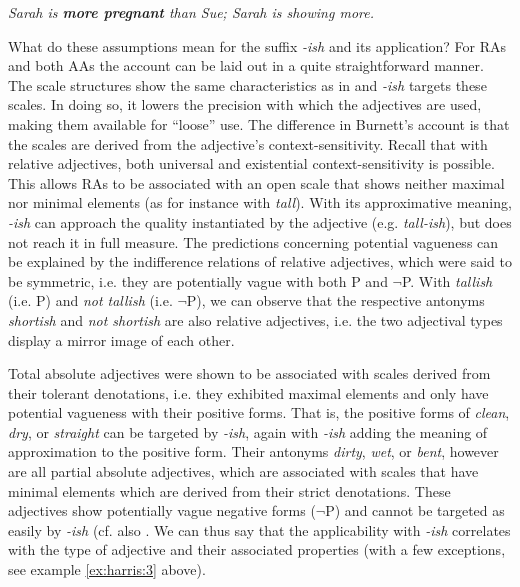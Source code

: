 \documentclass[output=paper]{langsci/langscibook}
\begin{document}
\ea
	\itshape Sarah is \textbf{more pregnant} than Sue; Sarah is showing more.
\z

What do these assumptions mean for the suffix \textit{-ish} and its application? For RAs and both AAs the account can be laid out in a quite straightforward manner. The scale structures show the same characteristics as in \citet*{Bochnak2014} and \textit{-ish} targets these scales. In doing so, it lowers the precision with which the adjectives are used, making them available for ``loose'' use. The difference in Burnett's \citeyearpar{Burnett2017} account is that the scales are derived from the adjective's context-sensitivity. Recall that with relative adjectives, both universal and existential context-sensitivity is possible. This allows RAs to be associated with an open scale that shows neither maximal nor minimal elements (as for instance with \textit{tall}). With its approximative meaning, \textit{-ish} can approach the quality instantiated by the adjective (e.g. \textit{tall-ish}), but does not reach it in full measure. The predictions concerning potential vagueness can be explained by the indifference relations of relative adjectives, which were said to be symmetric, i.e. they are potentially vague with both P and $\neg$P. With \textit{tallish} (i.e. P) and \textit{not tallish} (i.e. $\neg$P), we can observe that the respective antonyms \textit{shortish} and \textit{not shortish} are also relative adjectives, i.e. the two adjectival types display a mirror image of each other.

Total absolute adjectives were shown to be associated with scales derived from their tolerant denotations, i.e. they exhibited maximal elements and only have potential vagueness with their positive forms. That is, the positive forms of \textit{clean}, \textit{dry}, or \textit{straight} can be targeted by \textit{-ish}, again with \textit{-ish} adding the meaning of approximation to the positive form. Their antonyms \textit{dirty}, \textit{wet}, or \textit{bent}, however are all partial absolute adjectives, which are associated with scales that have minimal elements which are derived from their strict denotations. These adjectives show potentially vague negative forms ($\neg$P) and cannot be targeted as easily by \textit{-ish} (cf. also \citealt[437]{Bochnak2014}. We can thus say that the applicability with \textit{-ish} correlates with the type of adjective and their associated properties (with a few exceptions, see example \ref{ex:harris:3} above).
\end{document}
